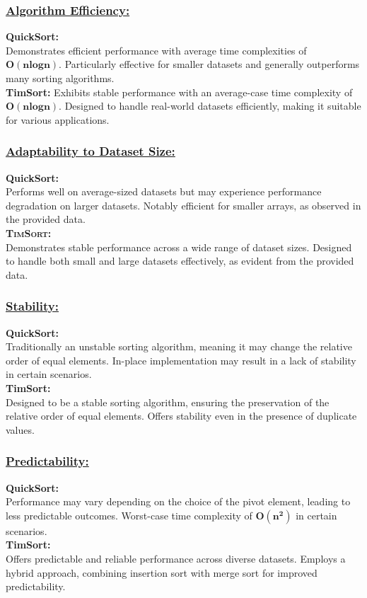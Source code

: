 \documentclass[a4paper, 9pt, twocolumn]{article}
\begin{document}
\subsubsection{\underline{Algorithm Efficiency:}}
\textbf{QuickSort:}\\
Demonstrates efficient performance with average time complexities of $\boldsymbol{O(n log n)}$.
Particularly effective for smaller datasets and generally outperforms many sorting algorithms.
\\
\textbf{TimSort:}\hspace{-1mm} Exhibits stable performance with an average-case time complexity of $\boldsymbol{O(n log n)}$.
Designed to handle real-world datasets efficiently, making it suitable for various applications.

\subsubsection{\underline{Adaptability to Dataset Size:}}
\textbf{QuickSort:}\\
Performs well on average-sized datasets but may experience performance degradation on larger datasets.
Notably efficient for smaller arrays, as observed in the provided data.\\
\textsc{\textbf{TimSort:}\\}
Demonstrates stable performance across a wide range of dataset sizes.
Designed to handle both small and large datasets effectively, as evident from the provided data.

\subsubsection{\underline{Stability:}}
\textbf{QuickSort:}\\
Traditionally an unstable sorting algorithm, meaning it may change the relative order of equal elements.
In-place implementation may result in a lack of stability in certain scenarios.\\
\textbf{TimSort:}\\
Designed to be a stable sorting algorithm, ensuring the preservation of the relative order of equal elements.
Offers stability even in the presence of duplicate values.

\subsubsection{\underline{Predictability:}}
\textbf{QuickSort:}\\
Performance may vary depending on the choice of the pivot element, leading to less predictable outcomes.
Worst-case time complexity of $\boldsymbol{O(n^2)}$ in certain scenarios.\\
\textbf{TimSort:}\\
Offers predictable and reliable performance across diverse datasets.
Employs a hybrid approach, combining insertion sort with merge sort for improved predictability.
\end{document}
